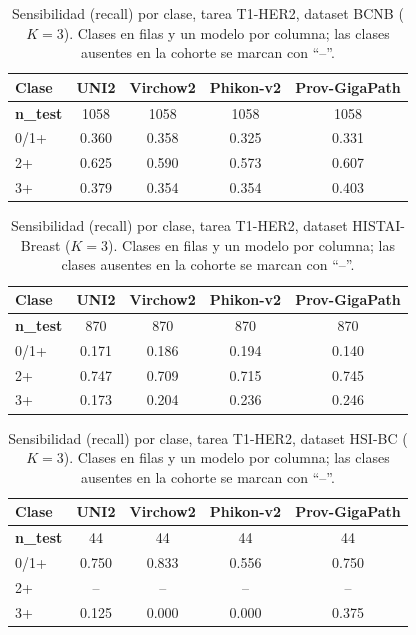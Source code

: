 \begin{table}[H]
\centering
\caption{Sensibilidad (recall) por clase, tarea T1-HER2, dataset BCNB ($K=3$). Clases en filas y un modelo por columna; las clases ausentes en la cohorte se marcan con ``--''.}
\label{tab:anexo_her2_sensibilidad}
\begin{tabular}{l c c c c}
\toprule
\textbf{Clase} & \textbf{UNI2} & \textbf{Virchow2} & \textbf{Phikon-v2} & \textbf{Prov-GigaPath} \\
\midrule
\textbf{n\_test} & 1058 & 1058 & 1058 & 1058 \\
0/1+ & 0.360 & 0.358 & 0.325 & 0.331 \\
2+ & 0.625 & 0.590 & 0.573 & 0.607 \\
3+ & 0.379 & 0.354 & 0.354 & 0.403 \\
\bottomrule
\end{tabular}
\end{table}

\begin{table}[H]
\centering
\caption{Sensibilidad (recall) por clase, tarea T1-HER2, dataset HISTAI-Breast ($K=3$). Clases en filas y un modelo por columna; las clases ausentes en la cohorte se marcan con ``--''.}
\label{tab:anexo_her2_sensibilidad_histai}
\begin{tabular}{l c c c c}
\toprule
\textbf{Clase} & \textbf{UNI2} & \textbf{Virchow2} & \textbf{Phikon-v2} & \textbf{Prov-GigaPath} \\
\midrule
\textbf{n\_test} & 870 & 870 & 870 & 870 \\
0/1+ & 0.171 & 0.186 & 0.194 & 0.140 \\
2+ & 0.747 & 0.709 & 0.715 & 0.745 \\
3+ & 0.173 & 0.204 & 0.236 & 0.246 \\
\bottomrule
\end{tabular}
\end{table}

\begin{table}[H]
\centering
\caption{Sensibilidad (recall) por clase, tarea T1-HER2, dataset HSI-BC ($K=3$). Clases en filas y un modelo por columna; las clases ausentes en la cohorte se marcan con ``--''.}
\label{tab:anexo_her2_sensibilidad_hsibc}
\begin{tabular}{l c c c c}
\toprule
\textbf{Clase} & \textbf{UNI2} & \textbf{Virchow2} & \textbf{Phikon-v2} & \textbf{Prov-GigaPath} \\
\midrule
\textbf{n\_test} & 44 & 44 & 44 & 44 \\
0/1+ & 0.750 & 0.833 & 0.556 & 0.750 \\
2+ & -- & -- & -- & -- \\
3+ & 0.125 & 0.000 & 0.000 & 0.375 \\
\bottomrule
\end{tabular}
\end{table}

